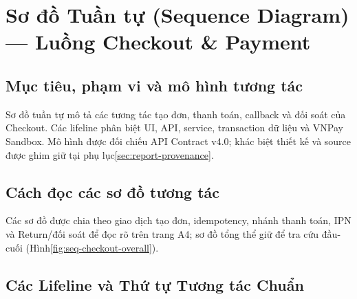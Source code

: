 
\providecommand{\BrewLiteSeqDiagramDir}{docs/report/assets}

\section{Sơ đồ Tuần tự (Sequence Diagram) — Luồng Checkout \& Payment}
\label{sec:sequence-diagram-checkout}
\subsection{Mục tiêu, phạm vi và mô hình tương tác}

Sơ đồ tuần tự mô tả các tương tác tạo đơn, thanh toán, callback và đối soát
của Checkout. Các lifeline phân biệt UI, API, service, transaction dữ liệu và
VNPay Sandbox. Mô hình được đối chiếu API Contract v4.0; khác biệt thiết kế
và source được ghim giữ tại phụ lục\ref{sec:report-provenance}.

\subsection{Cách đọc các sơ đồ tương tác}
Các sơ đồ được chia theo giao dịch tạo đơn, idempotency, nhánh thanh toán,
IPN và Return/đối soát để đọc rõ trên trang A4; sơ đồ tổng thể giữ để tra cứu
đầu-cuối (Hình\ref{fig:seq-checkout-overall}).

\subsection{Các Lifeline và Thứ tự Tương tác Chuẩn}

